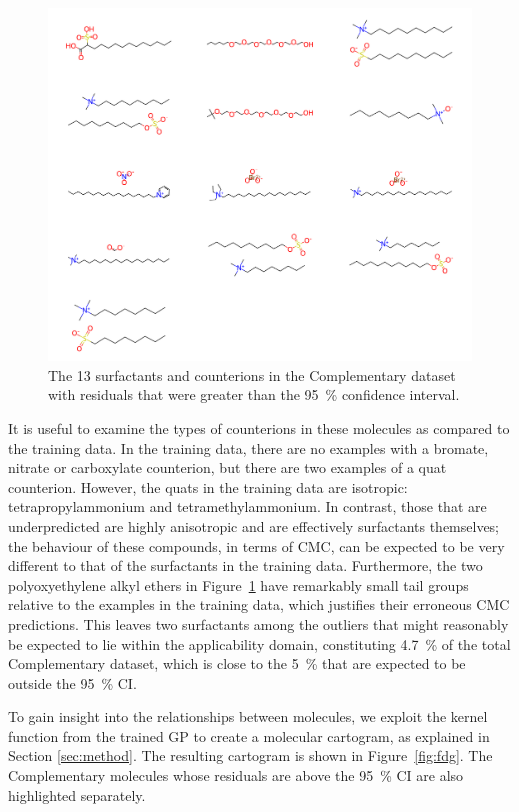 \begin{figure}
    \includegraphics[width=\textwidth]{images/nist-underpred.pdf}
    \caption{The 13 surfactants and counterions in the Complementary dataset with residuals
        that were greater than the \SI{95}{\%} confidence interval.}
    \label{fig:nist-underpred}
\end{figure}

It is useful to examine the types of counterions in these molecules as compared
to the training data. In the training data, there are no examples with a
bromate, nitrate or carboxylate counterion, but there are two examples of a quat
counterion. However, the quats in the training data are isotropic:
tetrapropylammonium and tetramethylammonium. In contrast, those that are
underpredicted are highly anisotropic and are effectively surfactants
themselves; the behaviour of these compounds, in terms of CMC, can be expected
to be very different to that of the surfactants in the training data.
Furthermore, the two polyoxyethylene alkyl ethers in
Figure~\ref{fig:nist-underpred} have remarkably small tail groups relative to
the examples in the training data, which justifies their erroneous CMC
predictions. This leaves two surfactants among the outliers that might
reasonably be expected to lie within the applicability domain, constituting
\SI{4.7}{\%} of the total Complementary dataset, which is close to the
\SI{5}{\%} that are expected to be outside the \SI{95}{\%} CI.

To gain insight into the relationships between molecules, we exploit the kernel
function from the trained GP to create a molecular cartogram, as explained in
Section \ref{sec:method}. The resulting cartogram is shown in
Figure~\ref{fig:fdg}. The Complementary molecules whose residuals are above the
\SI{95}{\%} CI are also highlighted separately.

